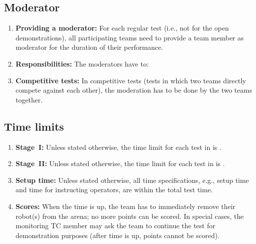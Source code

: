 \subsection{Moderator}
\label{rule:moderator}
\begin{enumerate}
	\item \textbf{Providing a moderator:} For each regular test (i.e., not for the open demonstrations), all participating teams need to provide a team member as moderator for the duration of their performance. 
	\item \textbf{Responsibilities:} The moderators have to:
	\item \textbf{Competitive tests:} In competitive tests (tests in which two teams directly compete against each other), the moderation has to be done by the two teams together.
\end{enumerate}


\subsection{Time limits}
\label{rule:time_limits}
\begin{enumerate}
	\item \textbf{Stage~I:} Unless stated otherwise, the time limit for each test in  is .
	\item \textbf{Stage~II:} Unless stated otherwise, the time limit for each test in  is .
	\item \textbf{Setup time:} Unless stated otherwise, all time specifications, e.g., setup time and time for instructing operators, are within the total test time. 
	\item \textbf{Scores:} When the time is up, the team has to immediately remove their robot(s) from the arena; no more points can be scored. In special cases, the monitoring TC member may ask the team to continue the test for demonstration purposes (after time is up, points cannot be scored). 
\end{enumerate}



